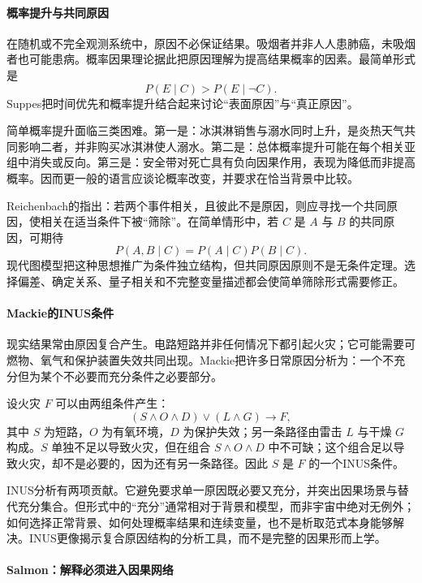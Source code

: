 \paragraph{概率提升与共同原因}

在随机或不完全观测系统中，原因不必保证结果。吸烟者并非人人患肺癌，未吸烟者也可能患病。概率因果理论据此把原因理解为提高结果概率的因素。最简单形式是
\[
P(E\mid C)>P(E\mid \neg C).
\]
Suppes把时间优先和概率提升结合起来讨论“表面原因”与“真正原因”\parencite{suppes1970}。

简单概率提升面临三类困难。第一是：冰淇淋销售与溺水同时上升，是炎热天气共同影响二者，并非购买冰淇淋使人溺水。第二是：总体概率提升可能在每个相关亚组中消失或反向。第三是：安全带对死亡具有负向因果作用，表现为降低而非提高概率。因而更一般的语言应谈论概率改变，并要求在恰当背景中比较。

Reichenbach的指出：若两个事件相关，且彼此不是原因，则应寻找一个共同原因，使相关在适当条件下被“筛除”\parencite{reichenbach1956}。在简单情形中，若 $C$ 是 $A$ 与 $B$ 的共同原因，可期待
\[
P(A,B\mid C)=P(A\mid C)P(B\mid C).
\]
现代图模型把这种思想推广为条件独立结构，但共同原因原则不是无条件定理。选择偏差、确定关系、量子相关和不完整变量描述都会使简单筛除形式需要修正。

\paragraph{Mackie的INUS条件}

现实结果常由原因复合产生。电路短路并非任何情况下都引起火灾；它可能需要可燃物、氧气和保护装置失效共同出现。Mackie把许多日常原因分析为：一个不充分但为某个不必要而充分条件之必要部分\parencite{mackie1974}。

设火灾 $F$ 可以由两组条件产生：
\[
(S\land O\land D)\lor(L\land G)\longrightarrow F,
\]
其中 $S$ 为短路，$O$ 为有氧环境，$D$ 为保护失效；另一条路径由雷击 $L$ 与干燥 $G$ 构成。$S$ 单独不足以导致火灾，但在组合 $S\land O\land D$ 中不可缺；这个组合足以导致火灾，却不是必要的，因为还有另一条路径。因此 $S$ 是 $F$ 的一个INUS条件。

INUS分析有两项贡献。它避免要求单一原因既必要又充分，并突出因果场景与替代充分集合。但形式中的“充分”通常相对于背景和模型，而非宇宙中绝对无例外；如何选择正常背景、如何处理概率结果和连续变量，也不是析取范式本身能够解决。INUS更像揭示复合原因结构的分析工具，而不是完整的因果形而上学。

\paragraph{Salmon：解释必须进入因果网络}


